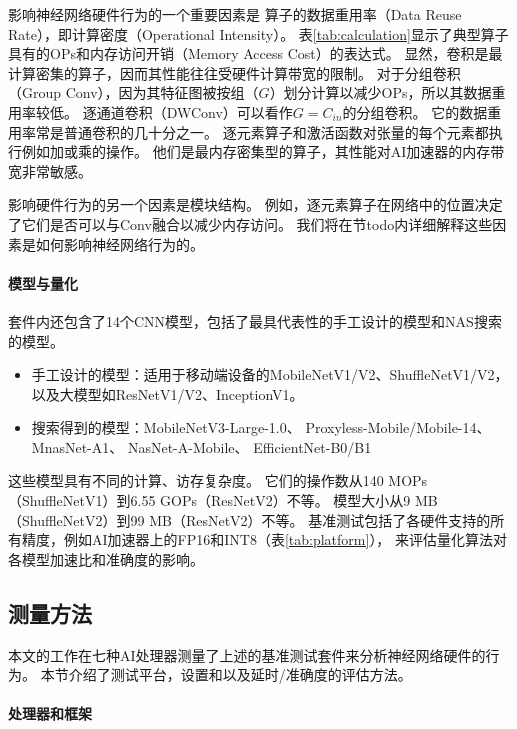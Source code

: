 
影响神经网络硬件行为的一个重要因素是
算子的数据重用率（Data Reuse Rate），即计算密度（Operational Intensity）。
表\ref{tab:calculation}显示了典型算子具有的OPs和内存访问开销（Memory Access Cost）的表达式。
显然，卷积是最计算密集的算子，因而其性能往往受硬件计算带宽的限制。
对于分组卷积（Group Conv），因为其特征图被按组（$G$）划分计算以减少OPs，所以其数据重用率较低。
逐通道卷积（DWConv）可以看作$G = C_{in}$的分组卷积。
它的数据重用率常是普通卷积的几十分之一。
逐元素算子和激活函数对张量的每个元素都执行例如加或乘的操作。
他们是最内存密集型的算子，其性能对AI加速器的内存带宽非常敏感。

影响硬件行为的另一个因素是模块结构。
例如，逐元素算子在网络中的位置决定了它们是否可以与Conv融合以减少内存访问。
我们将在节todo内详细解释这些因素是如何影响神经网络行为的。

\paragraph{模型与量化}
套件内还包含了14个CNN模型，包括了最具代表性的手工设计的模型和NAS搜索的模型。
\begin{itemize}
    \item 手工设计的模型：适用于移动端设备的MobileNetV1/V2、ShuffleNetV1/V2，
    以及大模型如ResNetV1/V2、InceptionV1\cite{szegedy2015going}。
    \item 搜索得到的模型：MobileNetV3-Large-1.0\cite{howard2019searching}、
    Proxyless-Mobile/Mobile-14\cite{cai2018proxylessnas}、
    MnasNet-A1\cite{tan2019mnasnet}、
    NasNet-A-Mobile\cite{zoph2018learning}、
    EfficientNet-B0/B1\cite{tan2019efficientnet}
\end{itemize}
这些模型具有不同的计算、访存复杂度。
它们的操作数从140 MOPs（ShuffleNetV1）到6.55 GOPs（ResNetV2）不等。
模型大小从9 MB（ShuffleNetV2）到99 MB（ResNetV2）不等。
基准测试包括了各硬件支持的所有精度，例如AI加速器上的FP16和INT8（表\ref{tab:platform}），
来评估量化算法对各模型加速比和准确度的影响。

\subsection{测量方法}
\label{measurement}
本文的工作在七种AI处理器测量了上述的基准测试套件来分析神经网络硬件的行为。
本节介绍了测试平台，设置和以及延时/准确度的评估方法。

\paragraph{处理器和框架}

